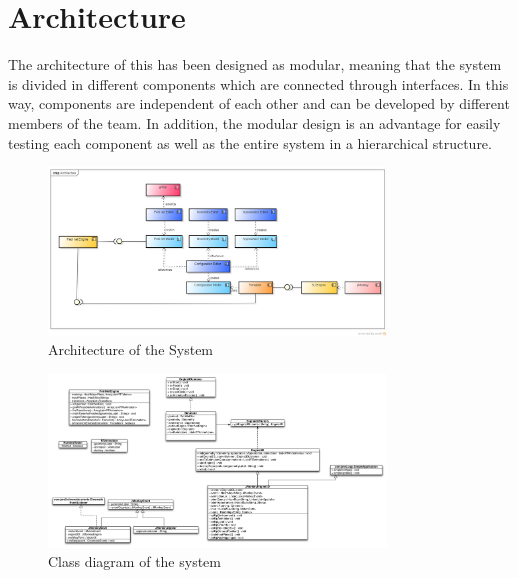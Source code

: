 \section{Architecture}
The architecture of this \epns has been designed as modular, meaning that the system is divided in different components which are connected through interfaces. In this way, components are independent of each other and can be developed by different members of the team. In addition, the modular design is an advantage for easily testing each component as well as the entire system in a hierarchical structure.     

\begin{figure}[htp]
\begin{center}
  \includegraphics[width=0.8\textwidth]{image/cd-architecture.png}
  \caption{Architecture of the System}
  \label{fig:architecture}
\end{center}
\end{figure}

\begin{figure}[htp]
\begin{center}
  \includegraphics[width=0.8\textwidth]{image/domain.pdf}
  \caption{Class diagram of the system}
  \label{fig:class-diagram}
\end{center}
\end{figure}









